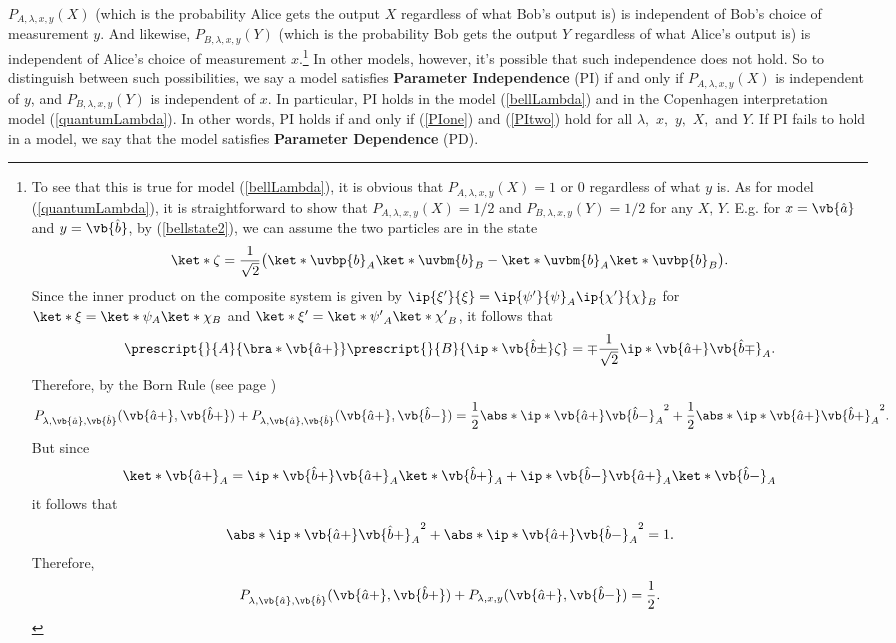\documentclass[12pt]{report}
\begin{document}
$P_{A,\lambda,x,y}(X)$ (which is the probability Alice gets the output $X$ regardless of what Bob's output is) is independent of Bob's choice of measurement $y$. And likewise, $P_{B,\lambda,x,y}(Y)$ (which is the probability Bob gets the output $Y$ regardless of what Alice's output is) is independent of Alice's choice of measurement $x$.\footnote{To see that this is true for model (\ref{bellLambda}), it is obvious that $P_{A, \lambda,x,y}(X)=1$ or 0 regardless of what $y$ is. As for model (\ref{quantumLambda}), it is straightforward to show\label{onehalf} that $P_{A, \lambda,x,y}(X)=1/2$ and $P_{B,\lambda,x,y}(Y)=1/2$ for any $X,\, Y$. E.g. for $x=\vb{\hat{a}}$ and $y=\vb{\hat{b}}$, by (\ref{bellstate2}), we can assume the two particles are in the state 
$$\ket*{\zeta}=\frac{1}{\sqrt{2}}\big(\ket*{\uvbp{b}}_A\ket*{\uvbm{b}}_B-\ket*{\uvbm{b}}_A\ket*{\uvbp{b}}_B\big).$$
Since the inner product on the composite system is given by  $\ip{\xi'}{\xi}=\ip{\psi'}{\psi}_A\ip{\chi'}{\chi}_B$ for $\ket*{\xi}=\ket*{\psi}_A\ket*{\chi}_B$ and $\ket*{\xi'}=\ket*{\psi'}_A\ket*{\chi'}_B$, it follows that 
$$\prescript{}{A}{ \bra*{\vb{\hat{a}+}}}\prescript{}{B}{\ip*{\vb{\hat{b}\pm}}{\zeta}}=\mp\frac{1}{\sqrt{2}}\ip*{\vb{\hat{a}+}}{\vb{\hat{b}\mp}}_A.$$ 
Therefore, by the Born Rule (see page \pageref{bornrule})
$$P_{\lambda,\vb{\hat{a}},\vb{\hat{b}}}(\vb{\hat{a}+}, \vb{\hat{b}+})+P_{\lambda,\vb{\hat{a}},\vb{\hat{b}}}(\vb{\hat{a}+},\vb{\hat{b}-})=\frac{1}{2}\abs*{\ip*{\vb{\hat{a}+}}{\vb{\hat{b}-}}_A}^2+\frac{1}{2}\abs*{\ip*{\vb{\hat{a}+}}{\vb{\hat{b}+}}_A}^2.$$
But since
$$\ket*{\vb{\hat{a}+}}_A=\ip*{\vb{\hat{b}+}}{\vb{\hat{a}+}}_A\ket*{\vb{\hat{b}+}}_A+\ip*{\vb{\hat{b}-}}{\vb{\hat{a}+}}_A\ket*{\vb{\hat{b}-}}_A$$
it follows that 
$$\abs*{\ip*{\vb{\hat{a}+}}{\vb{\hat{b}+}}_A}^2+\abs*{\ip*{\vb{\hat{a}+}}{\vb{\hat{b}-}}_A}^2 =1. $$
Therefore, 
$$P_{\lambda,\vb{\hat{a}},\vb{\hat{b}}}(\vb{\hat{a}+}, \vb{\hat{b}+})+P_{\lambda,x,y}(\vb{\hat{a}+},\vb{\hat{b}-})=\frac{1}{2}.$$
 } In other models, however, it's possible that such independence does not hold. So to distinguish between such possibilities, we say a model satisfies \textbf{Parameter Independence} (PI) \label{PIdef} if and only if $P_{A,\lambda,x,y}(X)$ is independent of $y$, and $P_{B,\lambda,x,y}(Y)$ is independent of $x$. In particular, PI holds in the model (\ref{bellLambda}) and in the Copenhagen interpretation model (\ref{quantumLambda}). In other words, PI holds if and only if (\ref{PIone}) and (\ref{PItwo}) hold for all $\lambda,$ $x,$ $y,$ $X,$ and $Y$. If PI fails to hold in a model, we say that the model satisfies \textbf{Parameter Dependence} (PD). %
%
\end{document}
